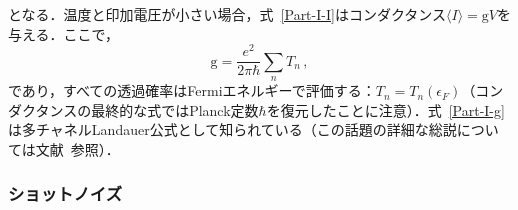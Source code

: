 \documentclass[a4paper,11pt]{ltjsarticle}
\begin{document}
となる．温度と印加電圧が小さい場合，式~\eqref{Part-I-I}はコンダクタンス$\langle I\rangle=\mathrm{g}V$を与える．ここで，
\begin{equation}\label{Part-I-g}
\mathrm{g}=\frac{e^{2}}{2\pi\hbar}\sum_{n}T_{n}\, ,
\end{equation}
であり，すべての透過確率はFermiエネルギーで評価する：$T_{n}=T_{n}(\epsilon_{F})$（コンダクタンスの最終的な式ではPlanck定数$\hbar$を復元したことに注意）．式~\eqref{Part-I-g}は多チャネルLandauer公式として知られている（この話題の詳細な総説については文献~\cite{Reviews-on-Landauer-1,Reviews-on-Landauer-2}参照）．



\subsubsection{ショットノイズ}\label{app_Part-I-2}
\end{document}
